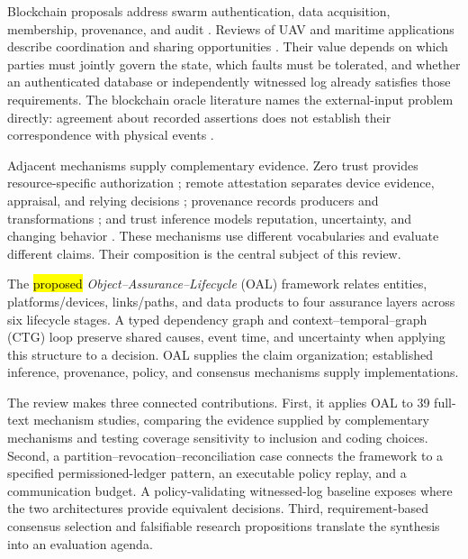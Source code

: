 \documentclass[blockchains,review,accept,moreauthors]{Definitions/mdpi}
\newcommand{\OAL}{\textit{Object--Assurance--Lifecycle} (OAL)}
\begin{document}
Blockchain proposals address swarm authentication, data acquisition, membership, provenance, and audit \citep{han2022identity,tan2022blockchain,karmakar2024blockchain,islam2019bus}. Reviews of UAV and maritime applications describe coordination and sharing opportunities \citep{hafeez2023blockchain,alladi2020applications,mehta2020blockchain,farah2024survey,li2021survey}. Their value depends on which parties must jointly govern the state, which faults must be tolerated, and whether an authenticated database or independently witnessed log already satisfies those requirements. The blockchain oracle literature names the external-input problem directly: agreement about recorded assertions does not establish their correspondence with physical events \citep{caldarelli2020oracle,albreiki2020oracles}.

Adjacent mechanisms supply complementary evidence. Zero trust provides resource-specific authorization \citep{rose2020zero,syed2022zero}; remote attestation separates device evidence, appraisal, and relying decisions \citep{birkholz2023remote}; provenance records producers and transformations \citep{w3c2013provdm,w3c2013provo}; and trust inference models reputation, uncertainty, and changing behavior \citep{ahmed2019trust,aaqib2023iot,jsang2016subjective}. These mechanisms use different vocabularies and evaluate different claims. Their composition is the central subject of this review.

The \hl{proposed} %
 \OAL{} framework relates entities, platforms/devices, links/paths, and data products to four assurance layers across six lifecycle stages. A typed dependency graph and context--temporal--graph (CTG) loop preserve shared causes, event time, and uncertainty when applying this structure to a decision. OAL supplies the claim organization; established inference, provenance, policy, and consensus mechanisms supply implementations.

The review makes three connected contributions. First, it applies OAL to 39 full-text mechanism studies, comparing the evidence supplied by complementary mechanisms and testing coverage sensitivity to inclusion and coding choices. Second, a partition--revocation--reconciliation case connects the framework to a specified permissioned-ledger pattern, an executable policy replay, and a communication budget. A policy-validating witnessed-log baseline exposes where the two architectures provide equivalent decisions. Third, requirement-based consensus selection and falsifiable research propositions translate the synthesis into an evaluation agenda.
\end{document}

